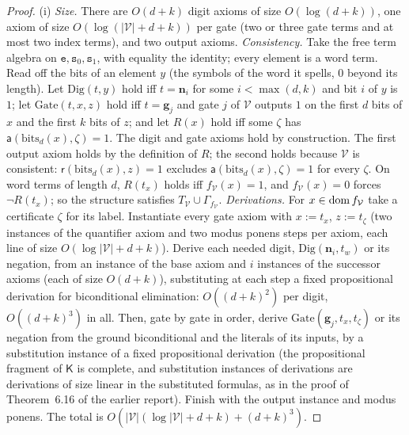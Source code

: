 \begin{proof}
(i) \emph{Size.} There are $O(d+k)$ digit axioms of size $O(\log(d+k))$, one axiom of size $O(\log(\lvert\mathcal V\rvert+d+k))$ per gate (two or three gate terms and at most two index terms), and two output axioms.
\emph{Consistency.} Take the free term algebra on $\mathtt e,\mathtt s_0,\mathtt s_1$, with equality the identity; every element is a word term. Read off the bits of an element $y$ (the symbols of the word it spells, $0$ beyond its length). Let $\mathrm{Dig}(t,y)$ hold iff $t=\mathbf n_i$ for some $i<\max(d,k)$ and bit $i$ of $y$ is $1$; let $\mathrm{Gate}(t,x,z)$ hold iff $t=\mathbf g_j$ and gate $j$ of $\mathcal V$ outputs $1$ on the first $d$ bits of $x$ and the first $k$ bits of $z$; and let $R(x)$ hold iff some $\zeta$ has $\mathsf a(\mathrm{bits}_d(x),\zeta)=1$. The digit and gate axioms hold by construction. The first output axiom holds by the definition of $R$; the second holds because $\mathcal V$ is consistent: $\mathsf r(\mathrm{bits}_d(x),z)=1$ excludes $\mathsf a(\mathrm{bits}_d(x),\zeta)=1$ for every $\zeta$. On word terms of length $d$, $R(t_x)$ holds iff $f_{\mathcal V}(x)=1$, and $f_{\mathcal V}(x)=0$ forces $\neg R(t_x)$; so the structure satisfies $T_{\mathcal V}\cup\Gamma_{f_{\mathcal V}}$.
\emph{Derivations.} For $x\in\operatorname{dom} f_{\mathcal V}$ take a certificate $\zeta$ for its label. Instantiate every gate axiom with $x:=t_x$, $z:=t_\zeta$ (two instances of the quantifier axiom and two modus ponens steps per axiom, each line of size $O(\log\lvert\mathcal V\rvert+d+k)$). Derive each needed digit, $\mathrm{Dig}(\mathbf n_i,t_w)$ or its negation, from an instance of the base axiom and $i$ instances of the successor axioms (each of size $O(d+k)$), substituting at each step a fixed propositional derivation for biconditional elimination: $O((d+k)^2)$ per digit, $O((d+k)^3)$ in all. Then, gate by gate in order, derive $\mathrm{Gate}(\mathbf g_j,t_x,t_\zeta)$ or its negation from the ground biconditional and the literals of its inputs, by a substitution instance of a fixed propositional derivation (the propositional fragment of $\mathsf K$ is complete, and substitution instances of derivations are derivations of size linear in the substituted formulas, as in the proof of Theorem~6.16 of the earlier report). Finish with the output instance and modus ponens. The total is $O(\lvert\mathcal V\rvert(\log\lvert\mathcal V\rvert+d+k)+(d+k)^3)$.

\end{proof}
